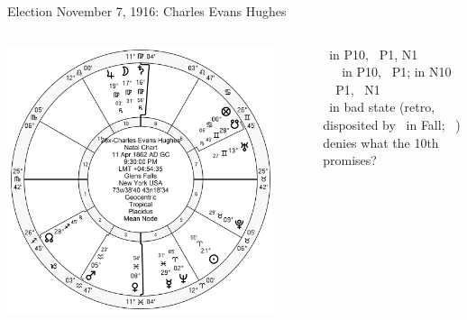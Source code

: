 \begin{frame}[t]{Election November 7, 1916: Charles Evans Hughes}
\small
\begin{columns}[T, onlytextwidth]
\vspace{-1em}
{\includegraphics[width=0.9\textwidth]{charts/Hughes.png}}
\fontsize{8pt}{9pt}\selectfont

\Venus\, in P10, \Square\, P1, N1 \\
\Saturn\, \Opposition\, \Venus\, in P10, \Square\, P1; in N10 \\
\Mars\, \Trine\, P1, \Sextile\, N1 \\
\vspace{1em}
\Saturn\, in bad state (retro, disposited by \Mercury\, in Fall; \Square\, \Uranus) denies what the 10th promises?


\end{columns}
\end{frame}
